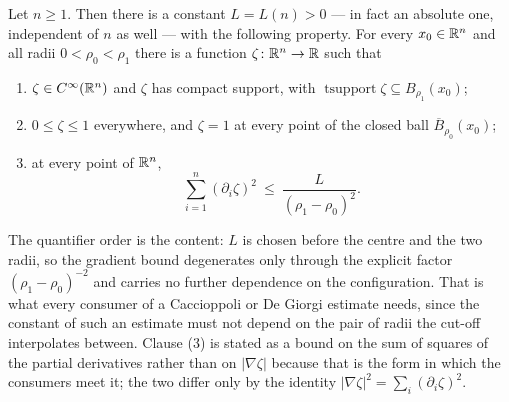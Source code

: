 \begin{lemma}
Let $n\ge1$.  Then there is a constant $L=L(n)>0$ --- in fact an absolute one,
independent of $n$ as well --- with the following property.  For every
$x_0\in\mathbb{R}^n$ and all radii $0<\rho_0<\rho_1$ there is a function
$\zeta\colon\mathbb{R}^n\to\mathbb{R}$ such that
\begin{enumerate}
\item $\zeta\in C^\infty(\mathbb{R}^n)$ and $\zeta$ has compact support, with
  $\operatorname{tsupport}\zeta\subseteq B_{\rho_1}(x_0)$;
\item $0\le\zeta\le1$ everywhere, and $\zeta=1$ at every point of the closed
  ball $\overline B_{\rho_0}(x_0)$;
\item at every point of $\mathbb{R}^n$,
  \[
  \sum_{i=1}^n(\partial_i\zeta)^2\ \le\ \frac L{(\rho_1-\rho_0)^2} .
  \]
\end{enumerate}

The quantifier order is the content: $L$ is chosen before the centre and the two
radii, so the gradient bound degenerates only through the explicit factor
$(\rho_1-\rho_0)^{-2}$ and carries no further dependence on the configuration.
That is what every consumer of a Caccioppoli or De Giorgi estimate needs, since
the constant of such an estimate must not depend on the pair of radii the
cut-off interpolates between.  Clause (3) is stated as a bound on the sum of
squares of the partial derivatives rather than on $|\nabla\zeta|$ because that
is the form in which the consumers meet it; the two differ only by the identity
$|\nabla\zeta|^2=\sum_i(\partial_i\zeta)^2$.
\end{lemma}
